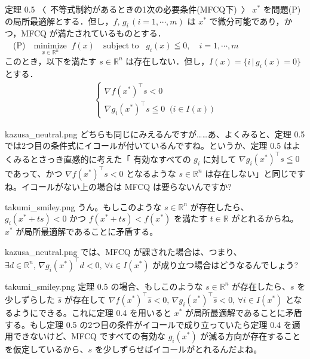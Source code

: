 \documentclass[b5paper,xelatex,ja=standard,10pt]{bxjsarticle}
\begin{document}
\begin{PROP}[colback=White]{定理 0.5 〈\, 不等式制約があるときの1次の必要条件(MFCQ下) \,〉}
$x^\ast$ を問題(P)の局所最適解とする．但し，$f, \, g_i \, (i = 1, \cdots, m)$ は $x^\ast$ で微分可能であり，かつ，MFCQ が満たされているものとする．
\\[3pt]
　(P)　$\displaystyle \underset{x \in \mathbb{R}^n}{\mathrm{minimize}} \; \; f(x)  \quad  \mathrm{subject \; to}   \; \; \; g_i(x) \leqq 0,  \quad i = 1, \cdots, m $
\\[3pt]
このとき，以下を満たす $s \in \mathbb{R}^n$ は存在しない．但し，$I(x) = \{i \, | \, g_i(x) = 0\}$ とする．
\begin{eqnarray*}
\left\{
\begin{array}{l}
\displaystyle \nabla f (x^\ast) ^\top s < 0  \\[5pt]
\nabla g_i (x^\ast) ^\top s \leqq 0  \; \; \bigl(i \in I(x) \, \bigr)
\end{array}
\right.
\end{eqnarray*}
\end{PROP}

\begin{SERIFU}[colback=PaleIris, colbacktitle=PaleIris2]{kazusa_neutral.png}
どちらも同じにみえるんですが……あ、よくみると、定理 0.5 では2つ目の条件式にイコールが付いているんですね。というか、定理 0.5 はよくみるとさっき直感的に考えた「 有効なすべての $g_i$ に対して $\nabla g_i(x^\ast)^\top s \leqq 0$ であって、かつ $\nabla f(x^\ast)^\top s < 0$ となるような $s \in \mathbb{R}^n$ は存在しない」と同じですね。イコールがない上の場合は MFCQ は要らないんですか?
\end{SERIFU}

\begin{SERIFU}[colback=PaleGold, colbacktitle=PaleGold2]{takumi_smiley.png}
うん。もしこのような $s \in \mathbb{R}^n$ が存在したら、$g_i(x^\ast + ts) < 0$ かつ $f(x^\ast + ts) < f(x^\ast)$ を満たす $t \in \mathbb{R}$ がとれるからね。$x^\ast$ が局所最適解であることに矛盾する。
\end{SERIFU}

\begin{SERIFU}[colback=PaleIris, colbacktitle=PaleIris2]{kazusa_neutral.png}
では、MFCQ が課された場合は、つまり、$\exists d \in \mathbb{R}^n, \, \nabla g_i(x^\ast) ^\top d < 0, \, \forall i \in I(x^\ast)$ が成り立つ場合はどうなるんでしょう?
\end{SERIFU}

\begin{SERIFU}[colback=PaleGold, colbacktitle=PaleGold2]{takumi_smiley.png}
定理 0.5 の場合、もしこのような $s \in \mathbb{R}^n$ が存在したら、$s$ を少しずらした $\hat{s}$ が存在して $\nabla f(x^\ast) ^\top \hat{s} < 0, \, \nabla g_i(x^\ast) ^\top \hat{s} < 0, \, \forall i \in I(x^\ast)$ となるようにできる。これに定理 0.4 を用いると $x^\ast$ が局所最適解であることに矛盾する。もし定理 0.5 の2つ目の条件がイコールで成り立っていたら定理 0.4 を適用できないけど、MFCQ ですべての有効な $g_i(x^\ast)$ が減る方向が存在することを仮定しているから、$s$ を少しずらせばイコールがとれるんだよね。
\end{SERIFU}
\end{document}
